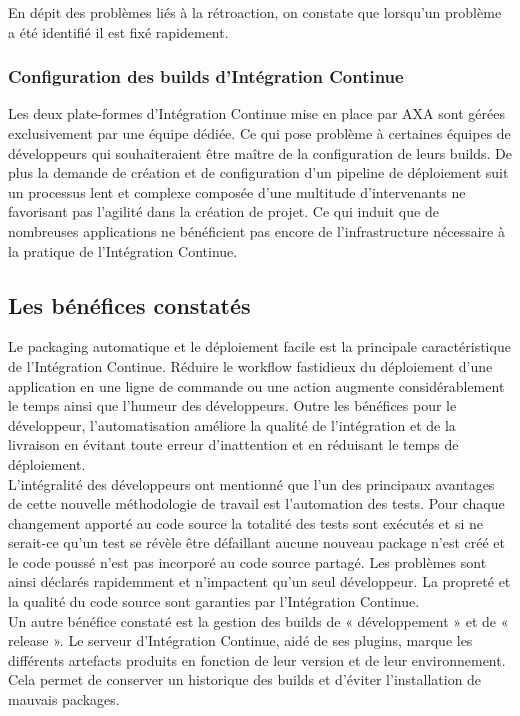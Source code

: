       En dépit des problèmes liés à la rétroaction, on constate que lorsqu'un problème a été identifié il est fixé rapidement.

      \subsubsection{Configuration des builds d'Intégration Continue}
      Les deux plate-formes d'Intégration Continue mise en place par AXA sont gérées exclusivement par une équipe dédiée. Ce qui pose problème à certaines équipes de développeurs qui souhaiteraient être maître de la configuration de leurs builds. De plus la demande de création et de configuration d'un pipeline de déploiement suit un processus lent et complexe composée d'une multitude d'intervenants ne favorisant pas l'agilité dans la création de projet. Ce qui induit que de nombreuses applications ne bénéficient pas encore de l'infrastructure nécessaire à la pratique de l'Intégration Continue.

    \subsection{Les bénéfices constatés}
    Le packaging automatique et le déploiement facile est la principale caractéristique de l'Intégration Continue. Réduire le workflow fastidieux du déploiement d'une application en une ligne de commande ou une action augmente considérablement le temps ainsi que l'humeur des développeurs. Outre les bénéfices pour le développeur, l'automatisation améliore la qualité de l'intégration et de la livraison en évitant toute erreur d'inattention et en réduisant le temps de déploiement.\\

    L'intégralité des développeurs ont mentionné que l'un des principaux avantages de cette nouvelle méthodologie de travail est l'automation des tests. Pour chaque changement apporté au code source la totalité des tests sont exécutés et si ne serait-ce qu'un test se révèle être défaillant aucune nouveau package n'est créé et le code poussé n'est pas incorporé au code source partagé. Les problèmes sont ainsi déclarés rapidemment et n'impactent qu'un seul développeur. La propreté et la qualité du code source sont garanties par l'Intégration Continue.\\

    Un autre bénéfice constaté est la gestion des builds de « développement » et de « release ». Le serveur d'Intégration Continue, aidé de ses plugins, marque les différents artefacts produits en fonction de leur version et de leur environnement. Cela permet de conserver un historique des builds et d'éviter l'installation de mauvais packages.\\

